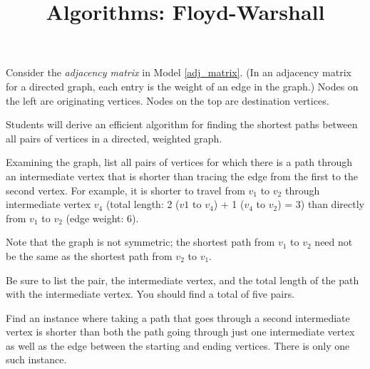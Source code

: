 \documentclass{tufte-handout}
\title{Algorithms: Floyd-Warshall}
\date{}
\begin{document}
\maketitle

\begin{questions}

\item Consider the \emph{adjacency matrix} in Model \ref{adj_matrix}. (In an adjacency matrix for a directed graph, each entry is the weight of an edge in the graph.) Nodes on the left are originating vertices. Nodes on the top are destination vertices.

\begin{objective}
  Students will derive an efficient algorithm for finding the shortest paths between all pairs of vertices in a directed, weighted graph.
\end{objective}

Examining the graph, list all pairs of vertices for which  there is a path through an intermediate vertex that is shorter than tracing the edge from the first to the second vertex. For example, it is shorter to travel from $v_1$ to $v_2$ through intermediate vertex $v_4$ (total length: 2 ($v1$ to $v_4$) + 1 ($v_4$ to $v_2$) = 3) than directly from $v_1$ to $v_2$ (edge weight: 6). 

Note that the graph is not symmetric; the shortest path from $v_1$ to $v_2$ need not be the same as the shortest path from $v_2$ to $v_1$. \label{inter_1}

Be sure to list the pair, the intermediate vertex, and the total length of the path with the intermediate vertex. You should find a total of five pairs.

\item Find an instance where taking a path that goes through a second intermediate vertex is shorter than both the path going through just one intermediate vertex as well as the edge between the starting and ending vertices. There is only one such instance.  \label{inter_2}



\end{questions}
\end{document}
